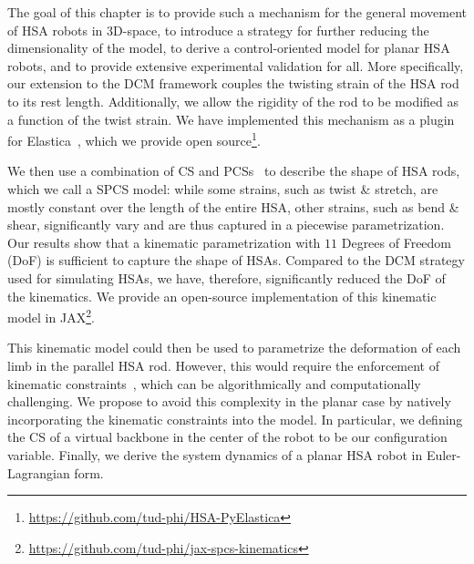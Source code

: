 The goal of this chapter is to provide such a mechanism for the general movement of \gls{HSA} robots in 3D-space, to introduce a strategy for further reducing the dimensionality of the model, to derive a control-oriented model for planar \gls{HSA} robots, and to provide extensive experimental validation for all. 
More specifically, our extension to the \gls{DCM} framework couples the twisting strain of the \gls{HSA} rod to its rest length. %
Additionally, we allow the rigidity of the rod to be modified as a function of the twist strain. %
We have implemented this mechanism as a plugin for Elastica~\citep{naughton2021elastica}, which we provide open source\footnote{\url{https://github.com/tud-phi/HSA-PyElastica}}. 

We then use a combination of \gls{CS} and \glspl{PCS}~\citep{renda2018discrete} to describe the shape of \gls{HSA} rods, which we call a \gls{SPCS} model: while some strains, such as twist \& stretch, are mostly constant over the length of the entire \gls{HSA}, other strains, such as bend \& shear, significantly vary and are thus captured in a piecewise parametrization. 
Our results show that a kinematic parametrization with $11$ Degrees of Freedom (DoF) is sufficient to capture the shape of \glspl{HSA}.
Compared to the \gls{DCM} strategy used for simulating \glspl{HSA}, we have, therefore, significantly reduced the DoF of the kinematics.
We provide an open-source implementation of this kinematic model in JAX\footnote{\url{https://github.com/tud-phi/jax-spcs-kinematics}}.

This kinematic model could then be used to parametrize the deformation of each limb in the parallel \gls{HSA} rod.
However, this would require the enforcement of kinematic constraints~\citep {armanini2021discrete}, which can be algorithmically and computationally challenging.
We propose to avoid this complexity in the planar case by natively incorporating the kinematic constraints into the model. In particular, we 
defining the \gls{CS} of a virtual backbone in the center of the robot to be our configuration variable.
Finally, we derive the system dynamics of a planar \gls{HSA} robot in Euler-Lagrangian form.

